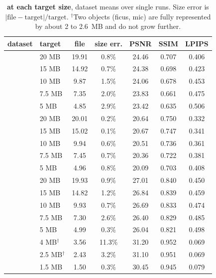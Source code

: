 \begin{table}[t]\centering\footnotesize
\caption{\textbf{\BM at each target size}, dataset means over single runs. Size error is $|\text{file}-\text{target}|/\text{target}$. $^\dagger$Two objects (ficus, mic) are fully represented by about 2 to 2.6~MB and do not grow further.}
\label{tab:main}
\setlength{\tabcolsep}{3.2pt}
\begin{tabular}{@{}llccccc@{}}
\toprule
dataset & target & file & size err. & PSNR & SSIM & LPIPS \\
\midrule
{} & 20 MB & 19.91 & 0.8\% & 24.46 & 0.707 & 0.406 \\
 & 15 MB & 14.92 & 0.7\% & 24.38 & 0.698 & 0.423 \\
 & 10 MB & 9.87 & 1.5\% & 24.06 & 0.678 & 0.453 \\
 & 7.5 MB & 7.35 & 2.0\% & 23.83 & 0.661 & 0.475 \\
 & 5 MB & 4.85 & 2.9\% & 23.42 & 0.635 & 0.506 \\
\midrule
{} & 20 MB & 20.01 & 0.2\% & 20.64 & 0.750 & 0.332 \\
 & 15 MB & 15.02 & 0.1\% & 20.67 & 0.747 & 0.341 \\
 & 10 MB & 9.94 & 0.6\% & 20.51 & 0.736 & 0.361 \\
 & 7.5 MB & 7.45 & 0.7\% & 20.36 & 0.722 & 0.381 \\
 & 5 MB & 4.96 & 0.8\% & 20.09 & 0.703 & 0.408 \\
\midrule
{} & 20 MB & 19.93 & 0.9\% & 27.01 & 0.840 & 0.450 \\
 & 15 MB & 14.82 & 1.2\% & 26.84 & 0.839 & 0.459 \\
 & 10 MB & 9.93 & 0.7\% & 26.69 & 0.833 & 0.474 \\
 & 7.5 MB & 7.30 & 2.6\% & 26.40 & 0.829 & 0.485 \\
 & 5 MB & 4.99 & 0.3\% & 26.04 & 0.821 & 0.498 \\
\midrule
{} & 4 MB$^\dagger$ & 3.56 & 11.3\% & 31.20 & 0.952 & 0.069 \\
 & 2.5 MB$^\dagger$ & 2.43 & 3.2\% & 31.10 & 0.951 & 0.069 \\
 & 1.5 MB & 1.50 & 0.3\% & 30.45 & 0.945 & 0.079 \\
\bottomrule
\end{tabular}
\end{table}

